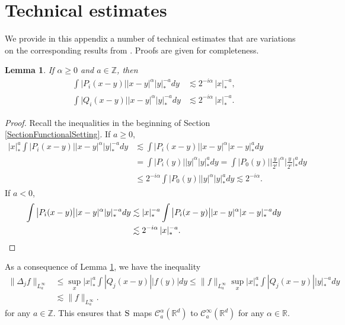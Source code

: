 \documentclass[JEP,XML,SOM,Unicode,published]{cedram}
\theoremstyle{plain}
\newtheorem{lem}[thm]{Lemma}
\theoremstyle{definition}
\newcommand{\bbR}{\mathbb{R}}
\newcommand{\bbZ}{\mathbb{Z}}
\newcommand{\mcC}{\mathcal{C}}
\begin{document}
\section{Technical estimates}
\label{SectionAppendix}

We provide in this appendix a number of technical estimates that are variations on the corresponding results from \cite{BH}. Proofs are given for completeness.

\begin{lem}\label{lem:weighted scaling}
If $\alpha\ge0$ and $a\in\bbZ$, then
\begin{align*}
\int \big|P_i(x-y)\big| |x-y|^\alpha|y|_*^{-a}dy&\lesssim2^{-i\alpha}\,|x|_*^{-a}, \\
\int \big|Q_i(x-y)\big| |x-y|^\alpha|y|_*^{-a}dy&\lesssim2^{-i\alpha}\,|x|_*^{-a}.
\end{align*}
\end{lem}

\begin{proof}
Recall the inequalities in the beginning of Section \ref{SectionFunctionalSetting}. If $a\ge0$,
\begin{align*}
|x|_*^a\int \big|P_i(x-y)\big| |x-y|^\alpha|y|_*^{-a}dy &\lesssim\int \big|P_i(x-y)\big| |x-y|^\alpha|x-y|_*^a dy\\
&= \int \big|P_i(y)\big| |y|^\alpha|y|_*^a dy = \int \big|P_0(y)\big| \Big|\frac{y}{2^i}\Big|^\alpha\Big|\frac{y}{2^i}\Big|_*^ady\\
&\le 2^{-i\alpha}\int \big|P_0(y)\big| |y|^\alpha |y|_*^ady\lesssim2^{-i\alpha}.
\end{align*}
If $a<0$,
\begin{align*}
\int \big|P_i(x-y)\big| |x-y|^\alpha |y|_*^{-a}dy &\lesssim|x|_*^{-a}\int \big|P_i(x-y)\big| |x-y|^\alpha|x-y|_*^{-a}dy\\
&\lesssim 2^{-i\alpha}\,|x|_*^{-a}.\qedhere
\end{align*}
\end{proof}

As a consequence of Lemma \ref{lem:weighted scaling}, we have the inequality
\begin{align*}
\|\Delta_jf\|_{L_a^\infty}
&\le\sup_x |x|_*^a\int|Q_j(x-y)||f(y)|dy
\le\|f\|_{L_a^\infty}\sup_x |x|_*^a\int|Q_j(x-y)||y|_*^{-a}dy\\
&\lesssim\|f\|_{L_a^\infty}.
\end{align*}
for any $a\in\bbZ$. This ensures that $\textsc{S}$ maps $\mcC_a^\alpha(\bbR^d)$ to $\mcC_a^\infty(\bbR^d)$ for any $\alpha\in\bbR$.
\end{document}
